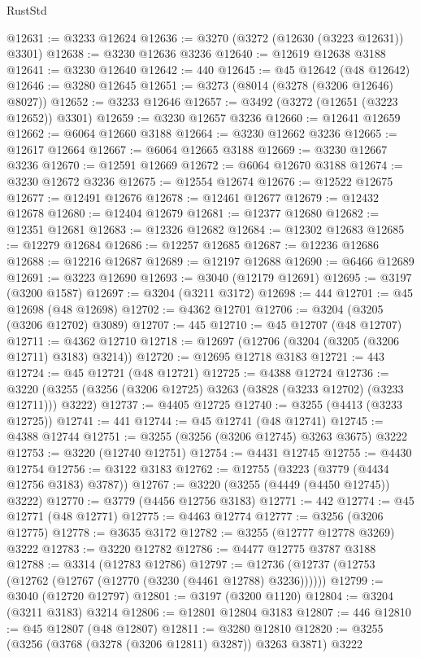 \begin{lexlean}{RustStd}
\begin{coremodule}
@12631 := @3233 @12624
@12636 := @3270 (@3272 (@12630 (@3223 @12631)) @3301)
@12638 := @3230 @12636 @3236
@12640 := @12619 @12638 @3188
@12641 := @3230 @12640
@12642 := 440
@12645 := @45 @12642 (@48 @12642)
@12646 := @3280 @12645
@12651 := @3273 (@8014 (@3278 (@3206 @12646) @8027))
@12652 := @3233 @12646
@12657 := @3492 (@3272 (@12651 (@3223 @12652)) @3301)
@12659 := @3230 @12657 @3236
@12660 := @12641 @12659
@12662 := @6064 @12660 @3188
@12664 := @3230 @12662 @3236
@12665 := @12617 @12664
@12667 := @6064 @12665 @3188
@12669 := @3230 @12667 @3236
@12670 := @12591 @12669
@12672 := @6064 @12670 @3188
@12674 := @3230 @12672 @3236
@12675 := @12554 @12674
@12676 := @12522 @12675
@12677 := @12491 @12676
@12678 := @12461 @12677
@12679 := @12432 @12678
@12680 := @12404 @12679
@12681 := @12377 @12680
@12682 := @12351 @12681
@12683 := @12326 @12682
@12684 := @12302 @12683
@12685 := @12279 @12684
@12686 := @12257 @12685
@12687 := @12236 @12686
@12688 := @12216 @12687
@12689 := @12197 @12688
@12690 := @6466 @12689
@12691 := @3223 @12690
@12693 := @3040 (@12179 @12691)
@12695 := @3197 (@3200 @1587)
@12697 := @3204 (@3211 @3172)
@12698 := 444
@12701 := @45 @12698 (@48 @12698)
@12702 := @4362 @12701
@12706 := @3204 (@3205 (@3206 @12702) @3089)
@12707 := 445
@12710 := @45 @12707 (@48 @12707)
@12711 := @4362 @12710
@12718 := @12697 (@12706 (@3204 (@3205 (@3206 @12711) @3183) @3214))
@12720 := @12695 @12718 @3183
@12721 := 443
@12724 := @45 @12721 (@48 @12721)
@12725 := @4388 @12724
@12736 := @3220 (@3255 (@3256 (@3206 @12725) @3263 (@3828 (@3233 @12702) (@3233 @12711))) @3222)
@12737 := @4405 @12725
@12740 := @3255 (@4413 (@3233 @12725))
@12741 := 441
@12744 := @45 @12741 (@48 @12741)
@12745 := @4388 @12744
@12751 := @3255 (@3256 (@3206 @12745) @3263 @3675) @3222
@12753 := @3220 (@12740 @12751)
@12754 := @4431 @12745
@12755 := @4430 @12754
@12756 := @3122 @3183
@12762 := @12755 (@3223 (@3779 (@4434 @12756 @3183) @3787))
@12767 := @3220 (@3255 (@4449 (@4450 @12745)) @3222)
@12770 := @3779 (@4456 @12756 @3183)
@12771 := 442
@12774 := @45 @12771 (@48 @12771)
@12775 := @4463 @12774
@12777 := @3256 (@3206 @12775)
@12778 := @3635 @3172
@12782 := @3255 (@12777 @12778 @3269) @3222
@12783 := @3220 @12782
@12786 := @4477 @12775 @3787 @3188
@12788 := @3314 (@12783 @12786)
@12797 := @12736 (@12737 (@12753 (@12762 (@12767 (@12770 (@3230 (@4461 @12788) @3236))))))
@12799 := @3040 (@12720 @12797)
@12801 := @3197 (@3200 @1120)
@12804 := @3204 (@3211 @3183) @3214
@12806 := @12801 @12804 @3183
@12807 := 446
@12810 := @45 @12807 (@48 @12807)
@12811 := @3280 @12810
@12820 := @3255 (@3256 (@3768 (@3278 (@3206 @12811) @3287)) @3263 @3871) @3222

\end{coremodule}
\end{lexlean}
